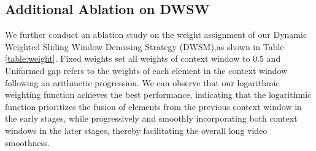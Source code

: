 \begin{table}[t!]\small
\caption{Ablation study on different weight assignment.
}
\vspace{-0.25in}
\begin{center}
\renewcommand\arraystretch{1.1}
\end{center}
\label{table:weight}
\vspace{-0.2in}
\end{table}


\subsection{Additional Ablation on DWSW}
\label{supp:ablation_window}
We further conduct an ablation study on the weight assignment of our Dynamic Weighted Sliding Window Denoising Strategy (DWSM),as shown in Table \ref{table:weight}.
Fixed weights set all weights of context window to 0.5 and Uniformed gap refers to the weights of each element in the context window following an arithmetic progression.
We can observe that our logarithmic weighting function achieves the best performance, indicating that the logarithmic function prioritizes the fusion of elements from the previous context window in the early stages, while progressively and smoothly incorporating both context windows in the later stages, thereby facilitating the overall long video smoothness.


